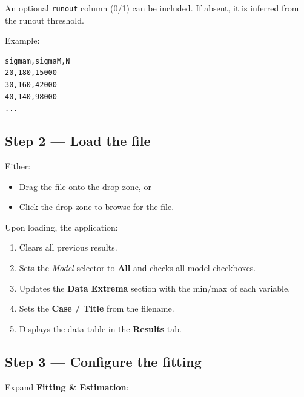 \documentclass[11pt,a4paper]{article}
\begin{document}
An optional \texttt{runout} column (0/1) can be included. If absent, it is inferred from the runout threshold.

Example:
\begin{lstlisting}
sigmam,sigmaM,N
20,180,15000
30,160,42000
40,140,98000
...
\end{lstlisting}

\subsection{Step 2 --- Load the file}

Either:
\begin{itemize}[leftmargin=1.4em]
  \item Drag the file onto the drop zone, or
  \item Click the drop zone to browse for the file.
\end{itemize}

Upon loading, the application:
\begin{enumerate}[leftmargin=1.4em]
  \item Clears all previous results.
  \item Sets the \textit{Model} selector to \textbf{All} and checks all model checkboxes.
  \item Updates the \textbf{Data Extrema} section with the min/max of each variable.
  \item Sets the \textbf{Case / Title} from the filename.
  \item Displays the data table in the \textbf{Results} tab.
\end{enumerate}

\subsection{Step 3 --- Configure the fitting}

Expand \textbf{Fitting \& Estimation}:
\end{document}
